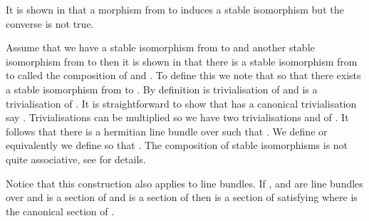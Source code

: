 \documentclass[a4paper,reqno]{amsart}
\theoremstyle{plain}
\theoremstyle{definition}
\theoremstyle{remark}
\numberwithin{equation}{section}
\numberwithin{figure}{section}
\providecommand{\<}{\langle}
\renewcommand{\>}{\rangle}
\begin{document}
It is shown in \cite{MurSte} that a morphism from  \coordHE{} to \coordHE{}
induces a stable isomorphism but the converse is not true.

Assume that we have a stable isomorphism \myHighlight{$\alpha$}\coordHE{} from  \coordHE{}
to \coordHE{}
and another stable isomorphism \myHighlight{$\beta$}\coordHE{} from \coordHE{} to \coordHE{} then
it is shown
in \cite{Ste} that there is a stable isomorphism \myHighlight{$\beta\circ \alpha$}\coordHE{}
from \coordHE{} to \coordHE{} called the composition of \myHighlight{$\alpha$}\coordHE{} and \myHighlight{$\beta$}\coordHE{}.
To define this we note that \coordHE{} so that
there exists a stable isomorphism \myHighlight{$\gamma $}\coordHE{} from \coordHE{} to \coordHE{}. By definition
\myHighlight{$\alpha$}\coordHE{} is trivialisation of \coordHE{} and \myHighlight{$\beta$}\coordHE{} is a trivialisation
of \coordHE{}. It is straightforward to show \cite{MurSte} that
\coordHE{}  has
a canonical trivialisation say \myHighlight{$\epsilon$}\coordHE{}.  Trivialisations can be
multiplied so we have
two trivialisations \myHighlight{$\alpha\otimes \beta $}\coordHE{} and \myHighlight{$\gamma \otimes
\epsilon$}\coordHE{} of \coordHE{}. It follows that there is a hermitian line bundle
\coordHE{} over \coordHE{} such that
\coordHE{}.  We define
\coordHE{} or equivalently we define
\myHighlight{$\beta \circ \alpha$}\coordHE{} so that \myHighlight{$\alpha\otimes \beta = (\beta \circ \alpha)
\otimes \epsilon$}\coordHE{}.  The composition of stable isomorphisms is not quite
associative, see  \cite{Ste} for details.

Notice that this construction also applies to line bundles. If \coordHE{},
\coordHE{} and \coordHE{} are
line bundles over \coordHE{} and  \myHighlight{$\alpha $}\coordHE{} is a section
of \coordHE{} and \myHighlight{$\beta$}\coordHE{} is a section of \coordHE{} then
\coordHE{} is a section of \coordHE{} satisfying \myHighlight{$\alpha
\otimes \beta =
(\beta\circ \alpha) \otimes \epsilon$}\coordHE{} where \myHighlight{$\epsilon$}\coordHE{} is the
canonical section of
\coordHE{}.
\end{document}
